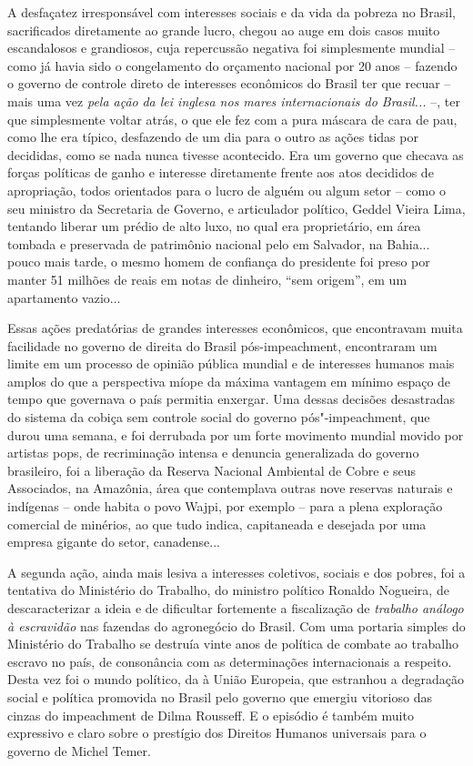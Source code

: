 A desfaçatez irresponsável com interesses sociais e da vida da pobreza
no Brasil, sacrificados diretamente ao grande lucro, chegou ao auge em
dois casos muito escandalosos e grandiosos, cuja repercussão negativa
foi simplesmente mundial -- como já havia sido o congelamento do
orçamento nacional por 20 anos -- fazendo o governo de controle direto
de interesses econômicos do Brasil ter que recuar -- mais uma vez
\emph{pela ação} \emph{da lei inglesa nos mares internacionais do
Brasil...} --, ter que simplesmente voltar atrás, o que ele fez com a
pura máscara de cara de pau, como lhe era típico, desfazendo de um dia
para o outro as ações tidas por decididas, como se nada nunca tivesse
acontecido. Era um governo que checava as forças políticas de ganho e
interesse diretamente frente aos atos decididos de apropriação, todos
orientados para o lucro de alguém ou algum setor -- como o seu ministro
da Secretaria de Governo, e articulador político, Geddel Vieira Lima,
tentando liberar um prédio de alto luxo, no qual era proprietário, em
área tombada e preservada de patrimônio nacional pelo  em Salvador,
na Bahia... pouco mais tarde, o mesmo homem de confiança do presidente
foi preso por manter 51 milhões de reais em notas de dinheiro, ``sem
origem'', em um apartamento vazio...

Essas ações predatórias de grandes interesses econômicos, que encontravam
muita facilidade no governo de direita do Brasil pós-impeachment,
encontraram um limite em um processo de opinião pública mundial e de
interesses humanos mais amplos do que a perspectiva míope da máxima
vantagem em mínimo espaço de tempo que governava o país permitia
enxergar. Uma dessas decisões desastradas do sistema da cobiça sem
controle social do governo pós"-impeachment, que durou uma semana, e foi
derrubada por um forte movimento mundial movido por artistas pops, de
recriminação intensa e denuncia generalizada do governo brasileiro, foi
a liberação da Reserva Nacional Ambiental de Cobre e seus Associados, na
Amazônia, área que contemplava outras nove reservas naturais e indígenas
-- onde habita o povo Wajpi, por exemplo -- para a plena exploração
comercial de minérios, ao que tudo indica, capitaneada e desejada por
uma empresa gigante do setor, canadense...

A segunda ação, ainda mais lesiva a interesses coletivos, sociais e dos
pobres, foi a tentativa do Ministério do Trabalho, do ministro político
Ronaldo Nogueira, de descaracterizar a ideia e de dificultar fortemente
a fiscalização de \emph{trabalho análogo à escravidão} nas fazendas do
agronegócio do Brasil. Com uma portaria simples do Ministério do
Trabalho se destruía vinte anos de política de combate ao trabalho
escravo no país, de consonância com as determinações internacionais a
respeito. Desta vez foi o mundo político, da  à União Europeia, que
estranhou a degradação social e política promovida no Brasil pelo
governo que emergiu vitorioso das cinzas do impeachment de Dilma
Rousseff. E o episódio é também muito expressivo e claro sobre o
prestígio dos Direitos Humanos universais para o governo de Michel
Temer.

